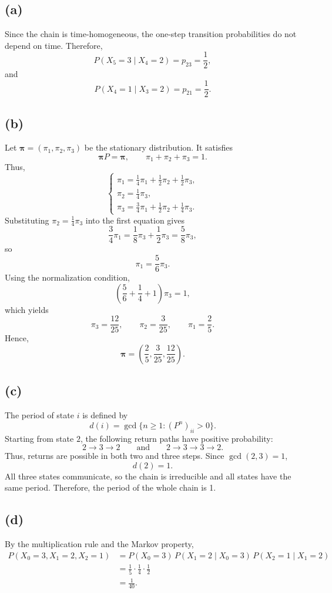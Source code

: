 \documentclass[11pt,a4paper]{article}
\begin{document}
\subsection*{(a)} Since the chain is time-homogeneous, the one-step
transition probabilities do not depend on time. Therefore,
\[
P(X_5=3\mid X_4=2)=p_{23}=\frac12,
\]
and
\[
P(X_4=1\mid X_3=2)=p_{21}=\frac12.
\]

\subsection*{(b)} Let \(\boldsymbol{\pi}=(\pi_1,\pi_2,\pi_3)\) be the
stationary distribution. It satisfies
\[
\boldsymbol{\pi}P=\boldsymbol{\pi},
\qquad
\pi_1+\pi_2+\pi_3=1.
\]
Thus,
\[
\begin{cases}
\pi_1=\frac14\pi_1+\frac12\pi_2+\frac12\pi_3,\\[2pt]
\pi_2=\frac14\pi_3,\\[2pt]
\pi_3=\frac34\pi_1+\frac12\pi_2+\frac14\pi_3.
\end{cases}
\]
Substituting \(\pi_2=\frac14\pi_3\) into the first equation gives
\[
\frac34\pi_1
=\frac18\pi_3+\frac12\pi_3
=\frac58\pi_3,
\]
so
\[
\pi_1=\frac56\pi_3.
\]
Using the normalization condition,
\[
\left(\frac56+\frac14+1\right)\pi_3=1,
\]
which yields
\[
\pi_3=\frac{12}{25},
\qquad
\pi_2=\frac3{25},
\qquad
\pi_1=\frac25.
\]
Hence,
\[
\boldsymbol{\pi}
=\left(\frac25,\frac3{25},\frac{12}{25}\right).
\]

\subsection*{(c)} The period of state \(i\) is defined by
\[
d(i)=\gcd\{n\ge1:(P^n)_{ii}>0\}.
\]
Starting from state \(2\), the following return paths have
positive probability:
\[
2\to3\to2
\qquad\text{and}\qquad
2\to3\to3\to2.
\]
Thus, returns are possible in both two and three steps.
Since \(\gcd(2,3)=1\),
\[d(2)=1.
\]
All three states communicate, so the chain is irreducible
and all states have the same period. Therefore, the period of the whole chain is 1.
\subsection*{(d)} By the multiplication rule and the Markov property,
\[
\begin{aligned}
P(X_0=3,X_1=2,X_2=1)
&=P(X_0=3)\,
P(X_1=2\mid X_0=3)\,
P(X_2=1\mid X_1=2)\\
&=\frac15\cdot\frac14\cdot\frac12\\
&=\frac1{40}.
\end{aligned}
\]
\end{document}
